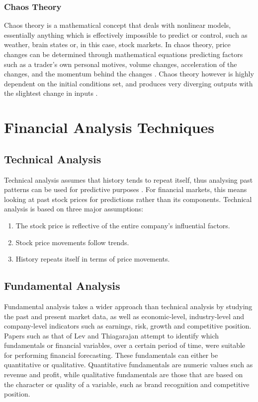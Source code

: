 \documentclass{UoYCSproject}
\begin{document}
\subsubsection{Chaos Theory}
Chaos theory is a mathematical concept that deals with nonlinear models, essentially anything which is effectively impossible to predict or control, such as weather, brain states or, in this case, stock markets. In chaos theory, price changes can be determined through mathematical equations predicting factors such as a trader's own personal motives, volume changes, acceleration of the changes, and the momentum behind the changes \cite{chaostheory}. Chaos theory however is highly dependent on the initial conditions set, and produces very diverging outputs with the slightest change in inputs \cite{kellert1993wake}. 

\section{Financial Analysis Techniques}
\subsection{Technical Analysis}
Technical analysis assumes that history tends to repeat itself, thus analysing past patterns can be used for predictive purposes \cite{levy1966conceptual}. For financial markets, this means looking at past stock prices for predictions rather than its components. Technical analysis is based on three major assumptions:
\begin{enumerate}
    \item The stock price is reflective of the entire company's influential factors.
    \item Stock price movements follow trends.
    \item History repeats itself in terms of price movements.
\end{enumerate}

\subsection{Fundamental Analysis}
Fundamental analysis takes a wider approach than technical analysis by studying the past and present market data, as well as economic-level, industry-level and company-level indicators such as earnings, risk, growth and competitive position. Papers such as that of Lev and Thiagarajan \cite{lev1993fundamental} attempt to identify which fundamentals or financial variables, over a certain period of time, were suitable for performing financial forecasting. These fundamentals can either be quantitative or qualitative. Quantitative fundamentals are numeric values such as revenue and profit, while qualitative fundamentals are those that are based on the character or quality of a variable, such as brand recognition and competitive position. 
\end{document}
